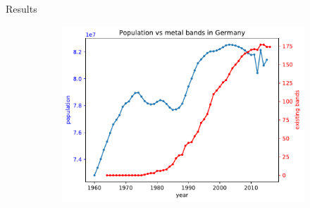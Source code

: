 \documentclass{beamer}
\begin{document}
\begin{frame}{Results}
\begin{figure}
		\begin{subfigure}[b]{0.3\textwidth}
			\includegraphics[width=\textwidth]{Population-Bands/populationVsBandGermany}
		\end{subfigure}
	\end{figure}
\end{frame}
\end{document}
